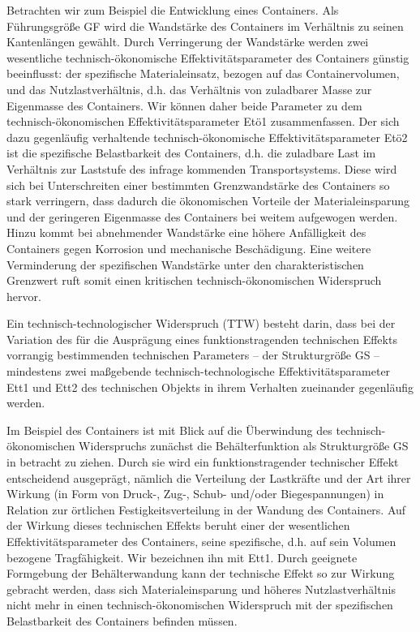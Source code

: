 \documentclass[12pt,a4paper]{article}
\begin{document}
Betrachten wir zum Beispiel die Entwicklung eines Containers. Als Führungsgröße
GF wird die Wandstärke des Containers im Verhältnis zu seinen Kantenlängen
gewählt. Durch Verringerung der Wandstärke werden zwei wesentliche
technisch-ökonomische Effektivitäts\-parameter des Containers günstig
beeinflusst: der spezifische Materialeinsatz, bezogen auf das Containervolumen,
und das Nutzlastverhältnis, d.h. das Verhältnis von zuladbarer Masse zur
Eigenmasse des Containers. Wir können daher beide Parameter zu dem
technisch-ökonomischen Effektivitätsparameter Etö1 zusammenfassen. Der sich
dazu gegenläufig verhaltende technisch-ökonomische Effektivitätsparameter Etö2
ist die spezifische Belastbarkeit des Containers, d.h. die zuladbare Last im
Verhältnis zur Laststufe des infrage kommenden Transportsystems. Diese wird
sich bei Unterschreiten einer bestimmten Grenzwandstärke des Containers so
stark verringern, dass dadurch die ökonomischen Vorteile der Materialeinsparung
und der geringeren Eigenmasse des Containers bei weitem aufgewogen werden.
Hinzu kommt bei abnehmender Wandstärke eine höhere Anfälligkeit des Containers
gegen Korrosion und mechanische Beschädigung. Eine weitere Verminderung der
spezifischen Wandstärke unter den charakteristischen Grenzwert ruft somit einen
kritischen technisch-ökonomischen Widerspruch hervor.

Ein technisch-technologischer Widerspruch (TTW) besteht darin, dass bei der
Variation des für die Ausprägung eines funktionstragenden technischen Effekts
vorrangig bestimmenden technischen Parameters – der Strukturgröße GS –
mindestens zwei maßgebende technisch-technologische Effektivitätsparameter Ett1
und Ett2 des technischen Objekts in ihrem Verhalten zueinander gegenläufig
werden.

Im Beispiel des Containers ist mit Blick auf die Überwindung des
technisch-ökonomischen Widerspruchs zunächst die Behälterfunktion als
Strukturgröße GS in betracht zu ziehen. Durch sie wird ein funktionstragender
technischer Effekt entscheidend ausgeprägt, nämlich die Verteilung der
Lastkräfte und der Art ihrer Wirkung (in Form von Druck-, Zug-, Schub- und/oder
Biegespannungen) in Relation zur örtlichen Festigkeitsverteilung in der Wandung
des Containers. Auf der Wirkung dieses technischen Effekts beruht einer der
wesentlichen Effektivitätsparameter des Containers, seine spezifische, d.h. auf
sein Volumen bezogene Tragfähigkeit. Wir bezeichnen ihn mit Ett1. Durch
geeignete Formgebung der Behälterwandung kann der technische Effekt so zur
Wirkung gebracht werden, dass sich Materialeinsparung und höheres
Nutzlastverhältnis nicht mehr in einen technisch-ökonomischen Widerspruch mit
der spezifischen Belastbarkeit des Containers befinden müssen.
\end{document}
